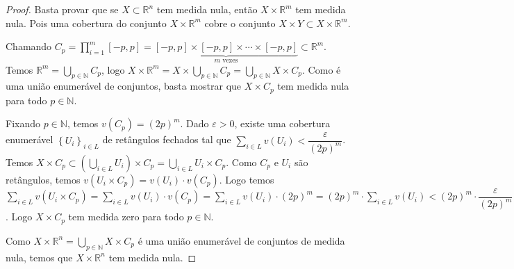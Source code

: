 \documentclass{article}
\theoremstyle{plain}
\theoremstyle{definition}
\theoremstyle{remark}
\begin{document}
\begin{proof}
	Basta provar que se $X\subset \mathbb{R}^n$ tem medida nula, então $X\times \mathbb{R}^m$ tem medida nula. Pois uma cobertura do conjunto $X\times \mathbb{R}^m$ cobre o conjunto $X\times Y \subset X \times \mathbb{R}^m$.


	Chamando $C_p =  \displaystyle\prod_{i  =  1}^{m} [-p, p] =\underbrace{ [-p,p] \times [-p,p]\times \cdots \times [-p,p]}_{m \text{ vezes}} \subset \mathbb{R}^m$. Temos $\mathbb{R}^m = \displaystyle\bigcup_{p \in \mathbb{N}} C_p$, logo $X\times \mathbb{R}^m = X\times\displaystyle\bigcup_{p\in \mathbb{N}} C_p = \displaystyle\bigcup_{p\in \mathbb{N}} X\times C_p$. Como é uma união enumerável de conjuntos, basta mostrar que $X\times C_p$ tem medida nula para todo $p\in \mathbb{N}$. 

	Fixando $ p \in \mathbb{N}$, temos $v\left(C_p\right) = (2p)^m$. Dado $\varepsilon > 0$, existe uma cobertura enumerável $\left\{ U_i\right\}_{i\in L}$ de retângulos fechados tal  que $\displaystyle\sum_{i \in L} v\left(U_i\right) < \dfrac{\varepsilon}{(2p)^m}$. Temos $X \times C_p \subset \left( \displaystyle\bigcup_{i \in L} U_i\right) \times C_p = \displaystyle\bigcup_{i \in L} U_i\times C_p$. Como $C_p$ e $U_i$ são retângulos, temos $v\left(U_i\times C_p \right) = v\left( U_i\right) \cdot v\left( C_p\right)$. Logo temos $\displaystyle\sum_{i \in L} v\left(U_i\times C_p\right) = \displaystyle\sum_{i \in L} v\left(U_i\right)\cdot v\left( C_p\right) = \displaystyle\sum_{i \in L} v\left(U_i\right) \cdot (2p)^{m} =  (2p)^{m}\cdot \displaystyle\sum_{i \in L} v\left(U_i\right) < (2p)^{m}\cdot \dfrac{\varepsilon}{(2p)^{m}} = \varepsilon$. Logo $X\times C_p$ tem medida zero para todo $p\in \mathbb{N}$.


	Como $X\times \mathbb{R}^n = \displaystyle\bigcup_{p\in \mathbb{N}} X\times C_p$ é uma união enumerável de conjuntos de medida nula, temos  que $X\times \mathbb{R}^n$ tem medida nula.

	
\end{proof}
\end{document}
